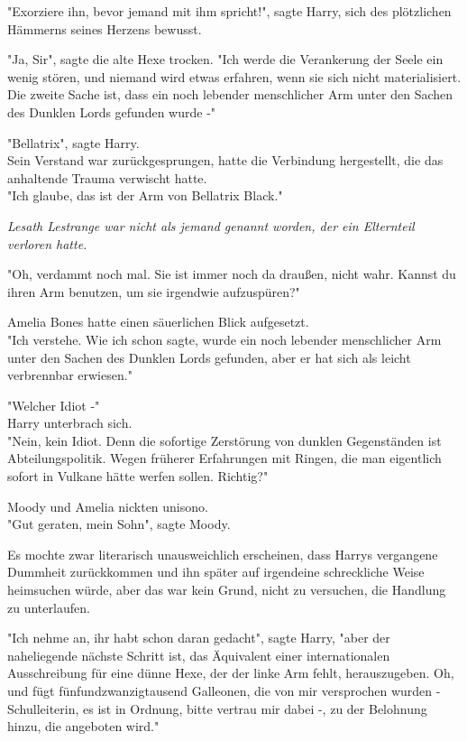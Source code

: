 {"Exorziere ihn, bevor jemand mit ihm spricht!", sagte Harry, sich des plötzlichen Hämmerns seines Herzens bewusst.

"Ja, Sir", sagte die alte Hexe trocken. "Ich werde die Verankerung der Seele ein wenig stören, und niemand wird etwas erfahren, wenn sie sich nicht materialisiert.\\ Die zweite Sache ist, dass ein noch lebender menschlicher Arm unter den Sachen des Dunklen Lords gefunden wurde -"

"Bellatrix", sagte Harry.\\ Sein Verstand war zurückgesprungen, hatte die Verbindung hergestellt, die das anhaltende Trauma verwischt hatte.\\ "Ich glaube, das ist der Arm von Bellatrix Black."

\emph{Lesath Lestrange war nicht als jemand genannt worden, der ein Elternteil verloren hatte.}

"Oh, verdammt noch mal. Sie ist immer noch da draußen, nicht wahr. Kannst du ihren Arm benutzen, um sie irgendwie aufzuspüren?"

Amelia Bones hatte einen säuerlichen Blick aufgesetzt.\\ "Ich verstehe. Wie ich schon sagte, wurde ein noch lebender menschlicher Arm unter den Sachen des Dunklen Lords gefunden, aber er hat sich als leicht verbrennbar erwiesen."

"Welcher Idiot -"\\ Harry unterbrach sich.\\ "Nein, kein Idiot. Denn die sofortige Zerstörung von dunklen Gegenständen ist Abteilungspolitik. Wegen früherer Erfahrungen mit Ringen, die man eigentlich sofort in Vulkane hätte werfen sollen. Richtig?"

Moody und Amelia nickten unisono.\\ "Gut geraten, mein Sohn", sagte Moody.

Es mochte zwar literarisch unausweichlich erscheinen, dass Harrys vergangene Dummheit zurückkommen und ihn später auf irgendeine schreckliche Weise heimsuchen würde, aber das war kein Grund, nicht zu versuchen, die Handlung zu unterlaufen.

"Ich nehme an, ihr habt schon daran gedacht", sagte Harry, "aber der naheliegende nächste Schritt ist, das Äquivalent einer internationalen Ausschreibung für eine dünne Hexe, der der linke Arm fehlt, herauszugeben. Oh, und fügt fünfundzwanzigtausend Galleonen, die von mir versprochen wurden - Schulleiterin, es ist in Ordnung, bitte vertrau mir dabei -, zu der Belohnung hinzu, die angeboten wird."

}
